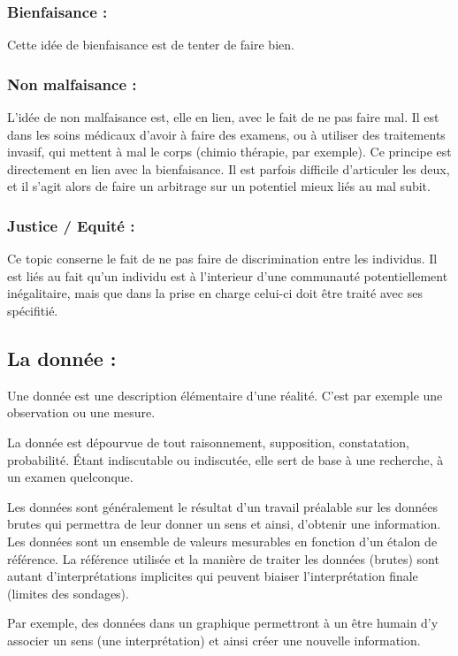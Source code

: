 \documentclass[a4paper,12pt]{article}
\begin{document}
\subsubsection{Bienfaisance : }

Cette idée de bienfaisance est de tenter de faire bien. 


\subsubsection{Non malfaisance : }

L'idée de non malfaisance est, elle en lien, avec le fait de ne pas faire mal. Il est dans les soins médicaux d'avoir à faire des examens, ou à utiliser des traitements invasif, qui mettent à mal le corps (chimio thérapie, par exemple). Ce principe est directement en lien avec la bienfaisance. Il est parfois difficile d'articuler les deux, et il s'agit alors de faire un arbitrage sur un potentiel mieux liés au mal subit. 


\subsubsection{Justice / Equité : }

Ce topic conserne le fait de ne pas faire de discrimination entre les individus. Il est liés au fait qu'un individu est à l'interieur d'une communauté potentiellement inégalitaire, mais que dans la prise en charge celui-ci doit être traité avec ses spécifitié. 

\subsection{La donnée : }
Une donnée est une description élémentaire d’une réalité. C’est par exemple une observation ou une mesure.

La donnée est dépourvue de tout raisonnement, supposition, constatation, probabilité. Étant indiscutable ou indiscutée, elle sert de base à une recherche, à un examen quelconque.

Les données sont généralement le résultat d'un travail préalable sur les données brutes qui permettra de leur donner un sens et ainsi, d'obtenir une information. Les données sont un ensemble de valeurs mesurables en fonction d'un étalon de référence. La référence utilisée et la manière de traiter les données (brutes) sont autant d’interprétations implicites qui peuvent biaiser l’interprétation finale (limites des sondages).

Par exemple, des données dans un graphique permettront à un être humain d'y associer un sens (une interprétation) et ainsi créer une nouvelle information.
\end{document}

